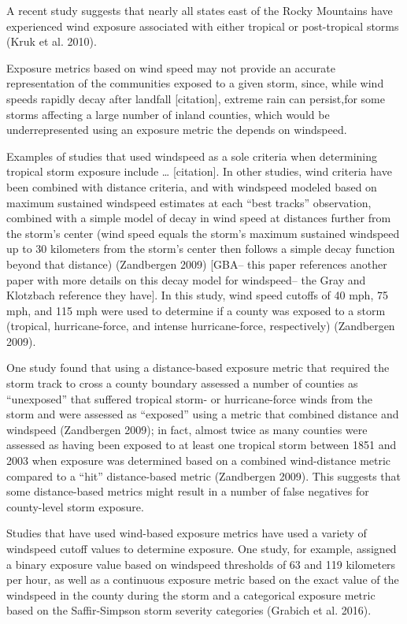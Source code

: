 \documentclass[]{elsarticle} %
\begin{document}
A recent study suggests that nearly all states east of the Rocky
Mountains have experienced wind exposure associated with either tropical
or post-tropical storms (Kruk et al. 2010).

Exposure metrics based on wind speed may not provide an accurate
representation of the communities exposed to a given storm, since, while
wind speeds rapidly decay after landfall {[}citation{]}, extreme rain
can persist,for some storms affecting a large number of inland counties,
which would be underrepresented using an exposure metric the depends on
windspeed.

Examples of studies that used windspeed as a sole criteria when
determining tropical storm exposure include \ldots{} {[}citation{]}. In
other studies, wind criteria have been combined with distance criteria,
and with windspeed modeled based on maximum sustained windspeed
estimates at each ``best tracks'' observation, combined with a simple
model of decay in wind speed at distances further from the storm's
center (wind speed equals the storm's maximum sustained windspeed up to
30 kilometers from the storm's center then follows a simple decay
function beyond that distance) (Zandbergen 2009) {[}GBA-- this paper
references another paper with more details on this decay model for
windspeed-- the Gray and Klotzbach reference they have{]}. In this
study, wind speed cutoffs of 40 mph, 75 mph, and 115 mph were used to
determine if a county was exposed to a storm (tropical, hurricane-force,
and intense hurricane-force, respectively) (Zandbergen 2009).

One study found that using a distance-based exposure metric that
required the storm track to cross a county boundary assessed a number of
counties as ``unexposed'' that suffered tropical storm- or
hurricane-force winds from the storm and were assessed as ``exposed''
using a metric that combined distance and windspeed (Zandbergen 2009);
in fact, almost twice as many counties were assessed as having been
exposed to at least one tropical storm between 1851 and 2003 when
exposure was determined based on a combined wind-distance metric
compared to a ``hit'' distance-based metric (Zandbergen 2009). This
suggests that some distance-based metrics might result in a number of
false negatives for county-level storm exposure.

Studies that have used wind-based exposure metrics have used a variety
of windspeed cutoff values to determine exposure. One study, for
example, assigned a binary exposure value based on windspeed thresholds
of 63 and 119 kilometers per hour, as well as a continuous exposure
metric based on the exact value of the windspeed in the county during
the storm and a categorical exposure metric based on the Saffir-Simpson
storm severity categories (Grabich et al. 2016).
\end{document}
